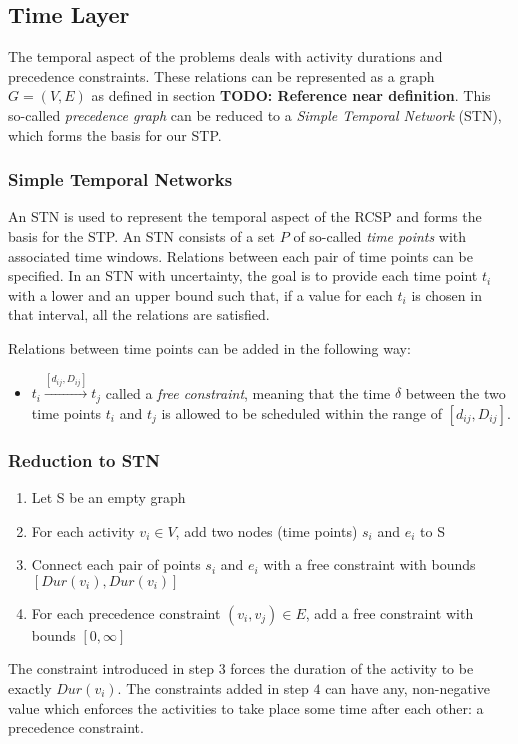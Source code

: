 \documentclass{article}
\newcommand{\TODO}[1]{{\color{red}\textbf{TODO: #1}}}
\begin{document}
\subsection{Time Layer}
The temporal aspect of the problems deals with activity durations and precedence constraints.
These relations can be represented as a graph $G=(V,E)$ as defined in section \TODO{Reference near definition}. 
This so-called \emph{precedence graph} can be reduced to a \emph{Simple Temporal Network} (STN), which forms the basis for our STP.

\subsubsection{Simple Temporal Networks}
An STN is used to represent the temporal aspect of the RCSP and forms the basis for the STP.
An STN consists of a set $P$ of so-called \emph{time points} with associated time windows.
Relations between each pair of time points can be specified.
In an STN with uncertainty, the goal is to provide each time point $t_i$ with a lower and an upper bound such that, if a value for each $t_i$ is chosen in that interval, all the relations are satisfied.

Relations between time points can be added in the following way:
\begin{itemize}
\item $t_i \xrightarrow{[d_{ij},D_{ij}]} t_j$ called a \emph{free constraint}, meaning that the time $\delta$ between the two time points $t_i$ and $t_j$ is allowed to be scheduled within the range of $[d_{ij},D_{ij}]$.
\end{itemize}

\subsubsection{Reduction to STN}
\begin{enumerate}
\item Let S be an empty graph
\item For each activity $v_i \in V$, add two nodes (time points) $s_i$ and $e_i$ to S
\item Connect each pair of points $s_i$ and $e_i$ with a free constraint with bounds $[Dur(v_i), Dur(v_i)]$
\item For each precedence constraint $(v_i, v_j) \in E$, add a free constraint with bounds $[0, \infty]$
\end{enumerate}

The constraint introduced in step $3$ forces the duration of the activity to be exactly $Dur(v_i)$. The constraints added in step $4$ can have any, non-negative value which enforces the activities to take place some time after each other: a precedence constraint.
\end{document}
